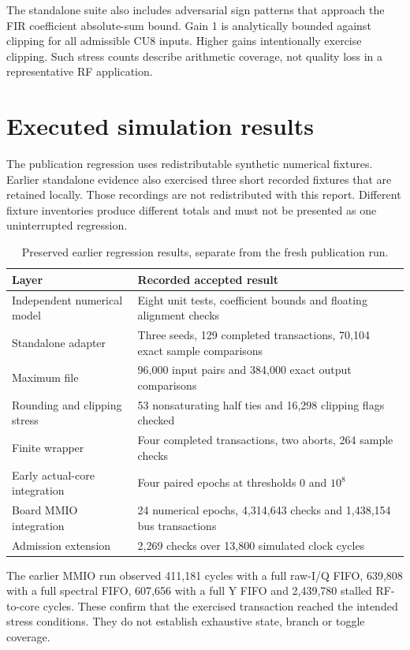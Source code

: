 \documentclass[11pt,letterpaper]{article}
\begin{document}
The standalone suite also includes adversarial sign patterns that approach the FIR coefficient absolute-sum bound. Gain 1 is analytically bounded against clipping for all admissible CU8 inputs. Higher gains intentionally exercise clipping. Such stress counts describe arithmetic coverage, not quality loss in a representative RF application.

\newpage
\section{Executed simulation results}


The publication regression uses redistributable synthetic numerical fixtures. Earlier standalone evidence also exercised three short recorded fixtures that are retained locally. Those recordings are not redistributed with this report. Different fixture inventories produce different totals and must not be presented as one uninterrupted regression.

\begin{table}[H]\centering\small
\caption{Preserved earlier regression results, separate from the fresh publication run.}
\begin{tabularx}{\linewidth}{@{}p{1.65in}Y@{}}\toprule
Layer & Recorded accepted result \\ \midrule
Independent numerical model & Eight unit tests, coefficient bounds and floating alignment checks \\
Standalone adapter & Three seeds, 129 completed transactions, 70,104 exact sample comparisons \\
Maximum file & 96,000 input pairs and 384,000 exact output comparisons \\
Rounding and clipping stress & 53 nonsaturating half ties and 16,298 clipping flags checked \\
Finite wrapper & Four completed transactions, two aborts, 264 sample checks \\
Early actual-core integration & Four paired epochs at thresholds 0 and $10^8$ \\
Board MMIO integration & 24 numerical epochs, 4,314,643 checks and 1,438,154 bus transactions \\
Admission extension & 2,269 checks over 13,800 simulated clock cycles \\
\bottomrule\end{tabularx}
\end{table}

The earlier MMIO run observed 411,181 cycles with a full raw-I/Q FIFO, 639,808 with a full spectral FIFO, 607,656 with a full Y FIFO and 2,439,780 stalled RF-to-core cycles. These confirm that the exercised transaction reached the intended stress conditions. They do not establish exhaustive state, branch or toggle coverage.
\end{document}
